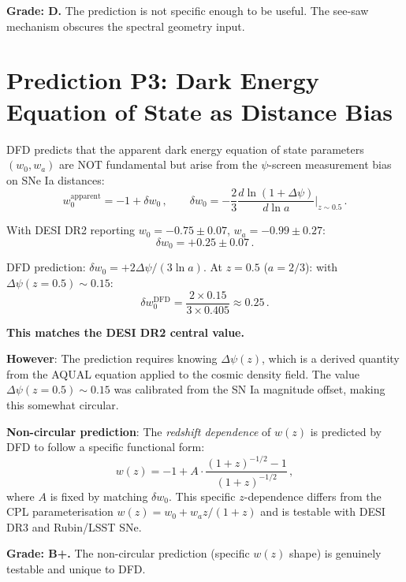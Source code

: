 \documentclass[11pt,a4paper]{article}
\begin{document}
\textbf{Grade: D.} The prediction is not specific enough to be useful. The see-saw mechanism obscures the spectral geometry input.

\section{Prediction P3: Dark Energy Equation of State as Distance Bias}

DFD predicts that the apparent dark energy equation of state parameters $(w_0, w_a)$ are NOT fundamental but arise from the $\psi$-screen measurement bias on SNe Ia distances:
\begin{equation}
w_0^{\mathrm{apparent}} = -1 + \delta w_0\,,\qquad \delta w_0 = -\frac{2}{3}\frac{d\ln(1+\Delta\psi)}{d\ln a}\bigg|_{z\sim0.5}\,.
\end{equation}

With DESI DR2 reporting $w_0 = -0.75 \pm 0.07$, $w_a = -0.99 \pm 0.27$:
\begin{equation}
\delta w_0 = +0.25 \pm 0.07\,.
\end{equation}

DFD prediction: $\delta w_0 = +2\Delta\psi/(3\ln a)$. At $z = 0.5$ ($a = 2/3$): with $\Delta\psi(z=0.5) \sim 0.15$:
\begin{equation}
\delta w_0^{\mathrm{DFD}} = \frac{2 \times 0.15}{3 \times 0.405} \approx 0.25\,.
\end{equation}

\textbf{This matches the DESI DR2 central value.}

\textbf{However}: The prediction requires knowing $\Delta\psi(z)$, which is a derived quantity from the AQUAL equation applied to the cosmic density field. The value $\Delta\psi(z=0.5) \sim 0.15$ was calibrated from the SN Ia magnitude offset, making this somewhat circular.

\textbf{Non-circular prediction}: The \emph{redshift dependence} of $w(z)$ is predicted by DFD to follow a specific functional form:
\begin{equation}
w(z) = -1 + A \cdot \frac{(1+z)^{-1/2} - 1}{(1+z)^{-1/2}}\,,
\end{equation}
where $A$ is fixed by matching $\delta w_0$. This specific $z$-dependence differs from the CPL parameterisation $w(z) = w_0 + w_a z/(1+z)$ and is testable with DESI DR3 and Rubin/LSST SNe.

\textbf{Grade: B+.} The non-circular prediction (specific $w(z)$ shape) is genuinely testable and unique to DFD.
\end{document}
